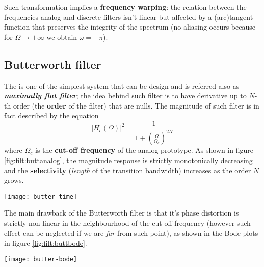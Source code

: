 		Such transformation implies a \textbf{frequency warping}: the relation between the frequencies analog and discrete filters isn't linear but affected by a (arc)tangent function that preserves the integrity of the spectrum (no aliasing occurs because for $\Omega \rightarrow \pm\infty$ we obtain $\omega= \pm \pi$).
		
		
		
		
		
		
		
		
		
		
		
		
	\subsection{Butterworth filter}
		The  is one of the simplest system that can be design and is referred also as \textbf{\textit{maximally flat filter}}; the idea behind such filter is to have derivative up to $N$-th order (the \textbf{order} of the filter) that are nulls. The magnitude of such filter is in fact described by the equation
		\begin{equation} \label{eq:filt:magbutter}
			|H_c(\Omega)|^2 = \frac{1}{1 + \left(\frac{\Omega}{\Omega_c}\right)^{2N}}
		\end{equation} 
		where $\Omega_c$ is the \textbf{cut-off frequency} of the analog prototype. As shown in figure \ref{fig:filt:buttanalog}, the magnitude response is strictly monotonically decreasing and the \textbf{selectivity} (\textit{length} of the transition bandwidth) increases as the order $N$ grows.
		
		\begin{SCfigure}[2][bht]
			\centering \texttt{[image: butter-time]}
			\caption{frequency response of the Butterworth filter with cut-off frequency $\Omega_c=1$ for various order $N$.} \label{fig:filt:buttanalog}
		\end{SCfigure}
	
		The main drawback of the Butterworth filter is that it's phase distortion is strictly non-linear in the neighbourhood of the cut-off frequency (however such effect can be neglected if we are \textit{far} from such point), as shown in the Bode plots in figure \ref{fig:filt:buttbode}.	
	
		\begin{SCfigure}[2][bht]
			\centering \texttt{[image: butter-bode]}
			\caption{Bode plots of the response of the Butterworth filter.} \label{fig:filt:buttbode}
		\end{SCfigure}
		
